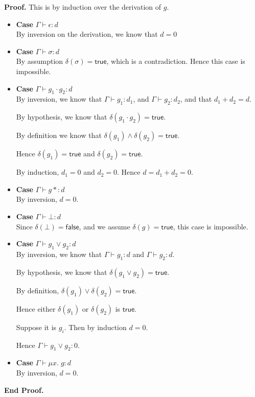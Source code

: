 \documentclass{article}
\newcommand{\fix}[2]{\mu {#1}.\;{#2}}
\newcommand{\judgebalance}[3][\Gamma]{{#1} \vdash {#2} : {#3}}
\newcommand{\true}{\mathsf{true}}
\newcommand{\false}{\mathsf{false}}
\newcommand{\emptify}[1]{\delta({#1})}
\newenvironment{proof}{\noindent\textbf{Proof.}}{\noindent\textbf{End Proof.}}
\newenvironment{caseblock}{\begin{itemize}}{\end{itemize}}
\newenvironment{case}[1]{\item \textbf{Case} {#1}\\}{}
\begin{document}
\begin{proof}
  This is by induction over the derivation of $g$. 
  \begin{caseblock}
    \begin{case}{$\judgebalance{\epsilon}{d}$}
      By inversion on the derivation, we know that $d = 0$
    \end{case}

    \begin{case}{$\judgebalance{\sigma}{d}$}
      By assumption $\emptify{\sigma} = \true$, which is a contradiction. Hence this
      case is impossible. 
    \end{case}

    \begin{case}{$\judgebalance{g_1\cdot g_2}{d}$}
      By inversion, we know that $\judgebalance{g_1}{d_1}$, and
      $\judgebalance{g_2}{d_2}$, and that $d_1 + d_2 = d$.  

      By hypothesis, we know that $\emptify{g_1\cdot g_2} = \true$. 

      By definition we know that $\emptify{g_1} \land \emptify{g_2} =
      \true$. 

      Hence $\emptify{g_1} = \true$ and $\emptify{g_2} = \true$.

      By induction, $d_1 = 0$ and $d_2 = 0$. Hence $d = d_1 + d_2 = 0$. 
    \end{case}

    \begin{case}{$\judgebalance{g*}{d}$}
      By inversion, $d = 0$. 
    \end{case}

    \begin{case}{$\judgebalance{\bot}{d}$}
      Since $\emptify{\bot} = \false$, and we assume $\emptify{g} = \true$, this case is
      impossible. 
    \end{case}

    \begin{case}{$\judgebalance{g_1 \vee g_2}{d}$}
      By inversion, we know that $\judgebalance{g_1}{d}$ and $\judgebalance{g_2}{d}$. 
      
      By hypothesis, we know that $\emptify{g_1 \vee g_2} = \true$. 

      By definition, $\emptify{g_1} \vee \emptify{g_2} = \true$. 
      
      Hence either $\emptify{g_1}$ or $\emptify{g_2}$ is $\true$. 

      Suppose it is $g_i$. Then by induction $d = 0$. 

      Hence $\judgebalance{g_1 \vee g_2}{0}$. 
    \end{case}

    \begin{case}{$\judgebalance{\fix{x}{g}}{d}$}
      By inversion, $d = 0$. 
    \end{case}
  \end{caseblock}
\end{proof}
\end{document}
